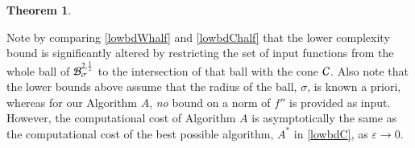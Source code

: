 \documentclass[review]{elsarticle}
\newcommand{\abstol}{\varepsilon}
\theoremstyle{definition}
\newenvironment{FJHchange}{}{} %
\newtheorem{theorem}{Theorem}
\begin{document}
\begin{FJHchange}
\begin{theorem}
\begin{enumerate}
\end{enumerate}			

\end{theorem}

Note by comparing \eqref{lowbdWhalf} and \eqref{lowbdChalf} that the lower complexity
bound is significantly altered by restricting the
set of input functions from the whole ball of $ \mathcal{B}^{2,\frac 12}_{\sigma}$ to the 
intersection of that ball with the cone $\mathcal{C}$. Also note that the lower bounds above 
assume that the radius of the ball, $\sigma$, is known a priori, whereas for our Algorithm 
$A$, \emph{no} bound on a norm of $f''$ is provided as  input. However, the
computational cost of Algorithm $A$ is asymptotically
the same as the computational cost of the best possible algorithm, $A^*$ in
\eqref{lowbdC}, as $\abstol \to 0$.
\end{FJHchange}
\end{document}
